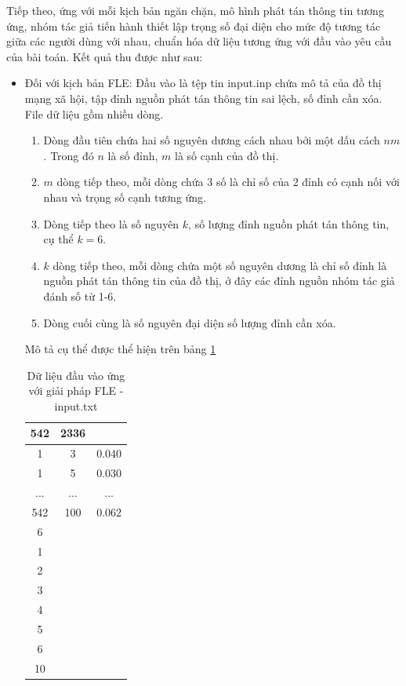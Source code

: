 Tiếp theo, ứng với mỗi kịch bản ngăn chặn, mô hình phát tán thông tin tương ứng, nhóm tác giả tiến hành thiết lập trọng số đại diện cho mức độ tương tác giữa các người dùng với nhau, chuẩn hóa dữ liệu tương ứng với đầu vào yêu cầu của bài toán. Kết quả thu được như sau:

\begin{itemize}
	\item Đối với kịch bản FLE: Đầu vào là tệp tin input.inp chứa mô tả của đồ thị mạng xã hội, tập đỉnh nguồn phát tán thông tin sai lệch, số đỉnh cần xóa.
	File dữ liệu gồm nhiều dòng. 
	\begin{enumerate}
		\item Dòng đầu tiên chứa hai số nguyên dương cách nhau bởi một dấu cách $n m$. Trong đó $n$ là số đỉnh, $m$ là số cạnh của đồ thị.
		\item $m$ dòng tiếp theo, mỗi dòng chứa 3 số là chỉ số của 2 đỉnh có cạnh nối với nhau và trọng số cạnh tương ứng.
		\item Dòng tiếp theo là số nguyên $k$, số lượng đỉnh nguồn phát tán thông tin, cụ thể $k = 6$.
		\item $k$ dòng tiếp theo, mỗi dòng chứa một số nguyên dương là chỉ số đỉnh là nguồn phát tán thông tin của đồ thị, ở đây các đỉnh nguồn nhóm tác giả đánh số từ 1-6.
		\item Dòng cuối cùng là số nguyên đại diện số lượng đỉnh cần xóa.
	\end{enumerate}
	Mô tả cụ thể được thể hiện trên bảng \ref{bang4_3}
	
	\begin{table} [!htp]
		\centering
		\begin{tabular}{|c|c|c|}
			\hline 
			542 & 2336 & \\ 
			\hline 
			1 & 3 & 0.040\\ 
			\hline 
			1 & 5 & 0.030\\ 
			\hline 
			... & ... & ...\\ 
			\hline 
			542 & 100 & 0.062\\
			\hline
			6 & & \\
			\hline
			1 & & \\
			\hline
			2 & & \\
			\hline
			3 & & \\
			\hline
			4 & & \\
			\hline
			5 & & \\
			\hline
			6 & & \\
			\hline
			10 & & \\
			\hline 
		\end{tabular}
		\caption{Dữ liệu đầu vào ứng với giải pháp FLE - input.txt}
		\label{bang4_3} 
	\end{table}
	

\end{itemize}
